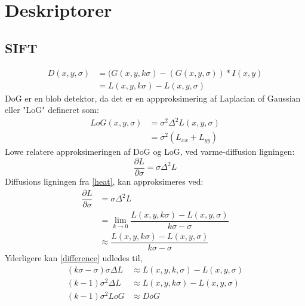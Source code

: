 \section{Deskriptorer}
\subsection{SIFT}

\begin{equation}
\begin{split}
D(x,y,\sigma) &= (G(x,y,k\sigma)-(G(x,y,\sigma))\ast I(x,y) \\
           &= L(x,y,k \sigma)-L(x,y,\sigma)
\end{split}
\end{equation}
DoG er en blob detektor, da det er en appproksimering af Laplacian of Gaussian eller "LoG" defineret som:
\begin{equation}
\begin{split}
LoG(x,y,\sigma) &= \sigma^2 \Delta^2L(x,y,\sigma) \\
                &= \sigma^2 (L_{xx}+L_{yy})
\end{split}
\end{equation}
Lowe relatere approksimeringen af DoG og LoG, ved varme-diffusion ligningen:
\begin{equation}
\dfrac{\partial L}{\partial \sigma} = \sigma \Delta^2L
\label{heat}
\end{equation}
Diffusions ligningen fra \eqref{heat}, kan approksimeres ved:
\begin{equation}
\begin{split}
\dfrac{\partial L}{\partial \sigma} &= \sigma \Delta^2L \\
&= \lim_{k \to 0} \dfrac{L(x,y,k\sigma)-L(x,y,\sigma)}{k\sigma-\sigma} \\
&\approx \dfrac{L(x,y,k\sigma)-L(x,y,\sigma)}{k\sigma-\sigma}
\end{split}
\label{difference}
\end{equation}
Yderligere kan \eqref{difference} udledes til,
\begin{equation}
\begin{split}
(k\sigma-\sigma)\sigma\Delta L &\approx L(x,y,k,\sigma)-L(x,y,\sigma) \\
(k-1)\sigma^2\Delta L &\approx L(x,y,k\sigma)-L(x,y,\sigma) \\
(k-1)\sigma^2LoG &\approx DoG
\end{split}
\end{equation}

